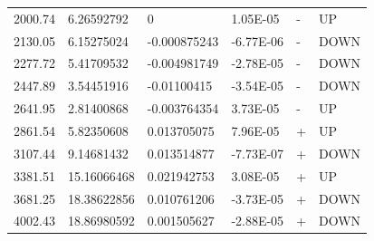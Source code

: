 \documentclass{article}
\begin{document}
\begin{table}
\begin{tabular}{@{}llllll@{}}
2000.74      & 6.26592792       & 0                & 1.05E-05  & -    & UP      \\
2130.05      & 6.15275024       & -0.000875243     & -6.77E-06 & -    & DOWN    \\
2277.72      & 5.41709532       & -0.004981749     & -2.78E-05 & -    & DOWN    \\
2447.89      & 3.54451916       & -0.01100415      & -3.54E-05 & -    & DOWN    \\
2641.95      & 2.81400868       & -0.003764354     & 3.73E-05  & -    & UP      \\
2861.54      & 5.82350608       & 0.013705075      & 7.96E-05  & +    & UP      \\
3107.44      & 9.14681432       & 0.013514877      & -7.73E-07 & +    & DOWN    \\
3381.51      & 15.16066468      & 0.021942753      & 3.08E-05  & +    & UP      \\
3681.25      & 18.38622856      & 0.010761206      & -3.73E-05 & +    & DOWN    \\
4002.43      & 18.86980592      & 0.001505627      & -2.88E-05 & +    & DOWN    \\ \bottomrule
\end{tabular}
\end{table}
\end{document}
